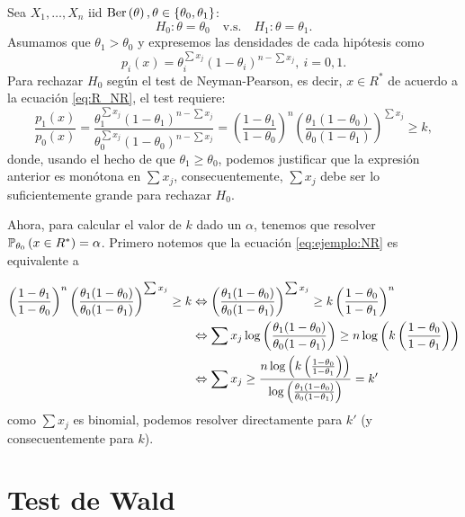 \begin{example}
	Sea $X_1,\ldots, X_n$ iid $\text{Ber}\left(\theta\right), \theta\in\{\theta_0,\theta_1\}$: 
	\begin{equation}
		H_0:\theta =\theta_0\quad \text{v.s.}\quad H_1:\theta = \theta_1.
	\end{equation} 
	Asumamos que $\theta_1>\theta_0$ y expresemos las densidades de cada hipótesis como 
	\begin{equation}
		p_i(x) = \theta_i^{\sum x_j}(1-\theta_i)^{n-\sum x_j},\ i=0,1.
	\end{equation}
	Para rechazar $H_0$ según el test de Neyman-Pearson, es decir, $x\in R^*$ de acuerdo a la ecuación \eqref{eq:R_NR}, el test requiere: 
	\begin{equation}
		\label{eq:ejemplo:NR}
		\frac{p_1(x)}{p_0(x)} = \frac{\theta_1^{\sum x_j}(1-\theta_1)^{n-\sum x_j}}{\theta_0^{\sum x_j}(1-\theta_0)^{n-\sum x_j}} = \left(\frac{1-\theta_1}{1-\theta_0}\right)^n\left(\frac{\theta_1(1-\theta_0)}{\theta_0(1-\theta_1)}\right)^{\sum x_j}\geq k,
	\end{equation}
	donde, usando el hecho de que $\theta_1\geq\theta_0$, podemos justificar que la expresión anterior es monótona en  $\sum x_j$, consecuentemente, $\sum x_j$ debe ser lo suficientemente grande para rechazar $H_0$.

	Ahora, para calcular el valor de $k$ dado un $\alpha$, tenemos que resolver $\mathbb{P}_{\theta_0} \left(x\in R^*\right) = \alpha$. Primero notemos que la ecuación \eqref{eq:ejemplo:NR} es equivalente a 

	\begin{align}
	 	\left(\frac{1-\theta_1}{1-\theta_0}\right)^n\left(\frac{\theta_1(1-\theta_0)}{\theta_0(1-\theta_1)}\right)^{\sum x_j}\geq k 
	 	& \Leftrightarrow 
	 	\left(\frac{\theta_1(1-\theta_0)}{\theta_0(1-\theta_1)}\right)^{\sum x_j}\geq k \left(\frac{1-\theta_0}{1-\theta_1}\right)^n\\
	 	& \Leftrightarrow 
	 	\sum x_j \log\left(\frac{\theta_1(1-\theta_0)}{\theta_0(1-\theta_1)}\right)\geq n \log\left(k \left(\frac{1-\theta_0}{1-\theta_1}\right)\right) \nonumber\\
	 	& \Leftrightarrow 
	 	\sum x_j \geq \frac{n \log\left(k \left(\frac{1-\theta_0}{1-\theta_1}\right)\right)}{\log\left(\frac{\theta_1(1-\theta_0)}{\theta_0(1-\theta_1)}\right)} = k' \nonumber
	 \end{align} 
	 como $\sum x_j$ es binomial, podemos resolver directamente para $k'$ (y consecuentemente para $k$).
\end{example}


\section{Test de Wald} 
\label{sub:test_de_wald}

